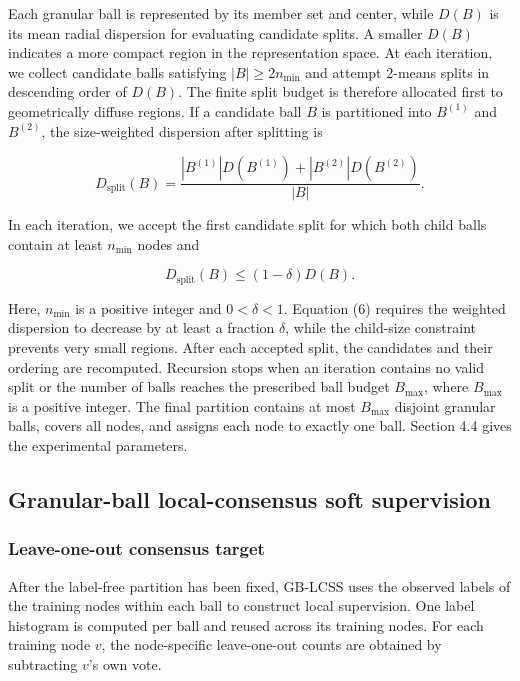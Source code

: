 \documentclass[10pt,letterpaper]{elsarticle}
\begin{document}
Each granular ball is represented by its member set and center, while \(D(B)\) is its mean radial dispersion for evaluating candidate splits. A smaller \(D(B)\) indicates a more compact region in the representation space. At each iteration, we collect candidate balls satisfying \(|B| \geq 2n_{\min}\) and attempt 2-means splits in descending order of \(D(B)\). The finite split budget is therefore allocated first to geometrically diffuse regions. If a candidate ball \(B\) is partitioned into \(B^{(1)}\) and \(B^{(2)}\), the size-weighted dispersion after splitting is

\begin{equation}\label{eq:5}
D_{\mathrm{split}}(B) = \frac{|B^{(1)}|D(B^{(1)}) + |B^{(2)}|D(B^{(2)})}{|B|}.
\end{equation}

In each iteration, we accept the first candidate split for which both child balls contain at least \(n_{\min}\) nodes and

\begin{equation}\label{eq:6}
D_{\mathrm{split}}(B) \leq (1 - \delta)D(B).
\end{equation}

Here, \(n_{\min}\) is a positive integer and \(0 < \delta < 1\). Equation (6) requires the weighted dispersion to decrease by at least a fraction \(\delta\), while the child-size constraint prevents very small regions. After each accepted split, the candidates and their ordering are recomputed. Recursion stops when an iteration contains no valid split or the number of balls reaches the prescribed ball budget \(B_{\max}\), where \(B_{\max}\) is a positive integer. The final partition contains at most \(B_{\max}\) disjoint granular balls, covers all nodes, and assigns each node to exactly one ball. Section 4.4 gives the experimental parameters.

\subsection{Granular-ball local-consensus soft supervision}\label{sec:3.4}

\subsubsection{Leave-one-out consensus target}\label{sec:3.4.1}

After the label-free partition has been fixed, GB-LCSS uses the observed labels of the training nodes within each ball to construct local supervision. One label histogram is computed per ball and reused across its training nodes. For each training node \(v\), the node-specific leave-one-out counts are obtained by subtracting \(v\)'s own vote.
\end{document}
